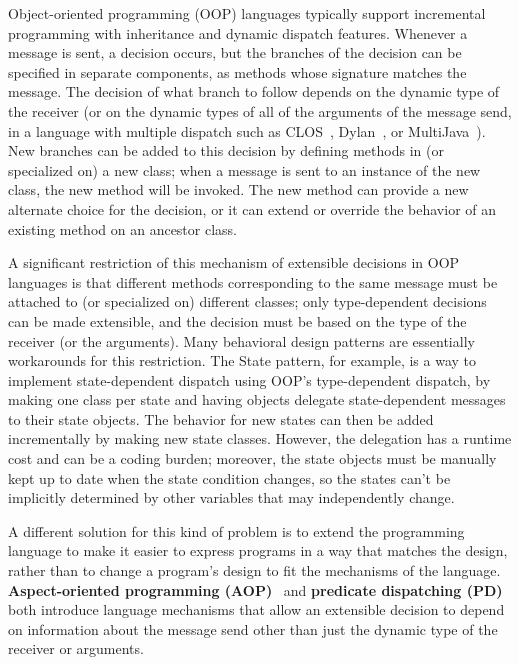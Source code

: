 \documentclass{acm_proc_article-sp}
\newcommand{\defn}[1]{\textbf{#1}}
\begin{document}
Object-oriented programming (OOP) languages typically support
incremental programming with inheritance and dynamic dispatch
features.  Whenever a message is sent, a decision occurs, but the
branches of the decision can be specified in separate components, as
methods whose signature matches the message.  The decision of what
branch to follow depends on the dynamic type of the receiver (or on
the dynamic types of all of the arguments of the message send, in a
language with multiple dispatch such as CLOS~\cite{CLtL},
Dylan~\cite{Dylan}, or MultiJava~\cite{MultiJava}).  New branches can
be added to this decision by defining methods in (or specialized on) a
new class; when a message is sent to an instance of the new class, the
new method will be invoked.  The new method can provide a new
alternate choice for the decision, or it can extend or override the
behavior of an existing method on an ancestor class.

A significant restriction of this mechanism of extensible decisions in
OOP languages is that different methods corresponding to the same
message must be attached to (or specialized on) different classes;
only type-dependent decisions can be made extensible, and the decision
must be based on the type of the receiver (or the arguments).  Many
behavioral design patterns \cite{gamma94design} are essentially
workarounds for this restriction.  The State pattern, for example, is
a way to implement state-dependent dispatch using OOP's type-dependent
dispatch, by making one class per state and having objects delegate
state-dependent messages to their state objects.  The behavior for new
states can then be added incrementally by making new state classes.
However, the delegation has a runtime cost and can be a coding burden;
moreover, the state objects must be manually kept up to date when the
state condition changes, so the states can't be implicitly determined
by other variables that may independently change.

A different solution for this kind of problem is to extend the
programming language to make it easier to express programs in a way
that matches the design, rather than to change a program's design to
fit the mechanisms of the language.  \defn{Aspect-oriented programming
(AOP)}~\cite{kiczales97aspectoriented} and \defn{predicate dispatching
(PD)}~\cite{predicate-dispatching} both introduce language mechanisms
that allow an extensible decision to depend on information about the
message send other than just the dynamic type of the receiver or
arguments.
\end{document}
